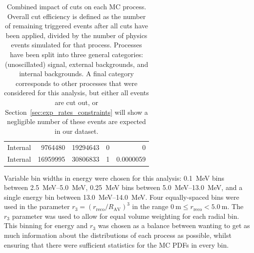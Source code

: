 \begin{table}
\begin{center}
\begin{tabulary}{\textwidth}{c R R R R}
            Internal  & \num{9764480} & \num{19294643} & \num{0} & 0 \\
            Internal  & \num{16959995} & \num{30806833} & \num{1} & 0.0000059 \\
            \hline
        \end{tabulary}
    \end{center}
    \caption[Combined impact of cuts on each MC process]
    {Combined impact of cuts on each MC process. Overall cut efficiency is defined as the number of remaining triggered events after all cuts have been applied, divided by the number of physics events simulated for that process. Processes have been split into three general categories: (unoscillated) signal, external backgrounds, and internal backgrounds. A final category corresponds to other processes that were considered for this analysis, but either all events are cut out, or Section~\ref{sec:exp_rates_constraints} will show a negligible number of these events are expected in our dataset.}
    \label{tab:MC_cut_effs}
\end{table}

Variable bin widths in energy were chosen for this analysis: \SI{0.1}{\MeV} bins between \SI{2.5}{\MeV}--\SI{5.0}{\MeV}, \SI{0.25}{\MeV} bins between \SI{5.0}{\MeV}--\SI{13.0}{\MeV}, and a single energy bin between \SI{13.0}{\MeV}--\SI{14.0}{\MeV}. Four equally-spaced bins were used in the parameter $r_{3} = (r_{\mathrm{reco}}/R_{\mathrm{AV}})^{3}$ in the range $\SI{0}{\m}\le r_{\mathrm{reco}} < \SI{5.0}{\m}$. The $r_{3}$ parameter was used to allow for equal volume weighting for each radial bin. This binning for energy and $r_{3}$ was chosen as a balance between wanting to get as much information about the distributions of each process as possible, whilst ensuring that there were sufficient statistics for the MC PDFs in every bin.


